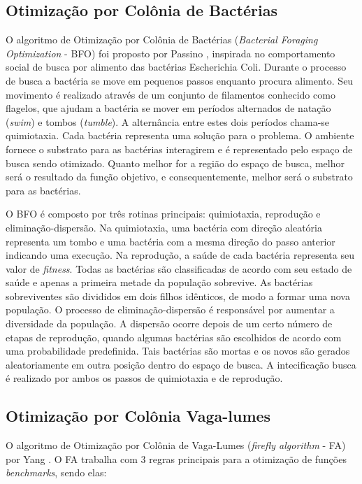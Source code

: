 \subsection{Otimização por Colônia de Bactérias}
\label{sec:biomimicry_bacterial_foraging}
O algoritmo de Otimização por Colônia de Bactérias (\textit{Bacterial Foraging Optimization} - BFO) foi proposto por Passino \cite{passino2002biomimicry}, inspirada no comportamento social de busca por alimento das bactérias Escherichia Coli. Durante o processo de busca a bactéria se move em pequenos passos enquanto procura alimento. Seu movimento é realizado através de um conjunto de filamentos conhecido como flagelos, que ajudam a bactéria se mover em períodos alternados de natação (\textit{swim}) e tombos (\textit{tumble}). A alternância entre estes dois períodos chama-se quimiotaxia. Cada bactéria representa uma solução para o problema. O ambiente fornece o substrato para as bactérias interagirem e é representado pelo espaço de busca sendo otimizado. Quanto melhor for a região do espaço de busca, melhor será o resultado da função objetivo, e consequentemente, melhor será o substrato para as bactérias.

O BFO é composto por três rotinas principais: quimiotaxia, reprodução e eliminação-dispersão. Na quimiotaxia, uma bactéria com direção aleatória representa um tombo e uma bactéria com a mesma direção do passo anterior indicando uma execução. Na reprodução, a saúde de cada bactéria representa seu valor de \textit{fitness}. Todas as bactérias são classificadas de acordo com seu estado de saúde e apenas a primeira metade da população sobrevive. As bactérias sobreviventes são divididos em dois filhos idênticos, de modo a formar uma nova população. O processo de eliminação-dispersão é responsável por aumentar a diversidade da população. A dispersão ocorre depois de um certo número de etapas de reprodução, quando algumas bactérias são escolhidos de acordo com uma probabilidade predefinida. Tais bactérias são mortas e os novos são gerados aleatoriamente em outra posição dentro do espaço de busca. A intecificação busca é realizado por ambos os passos de quimiotaxia e de reprodução.

\subsection{Otimização por Colônia Vaga-lumes}
\label{sec:firefly_algorithm}
O algoritmo de Otimização por Colônia de Vaga-Lumes (\textit{firefly algorithm} - FA) por Yang \cite{firefly}. O FA trabalha com 3 regras principais para a otimização de funções \textit{benchmarks}, sendo elas:

